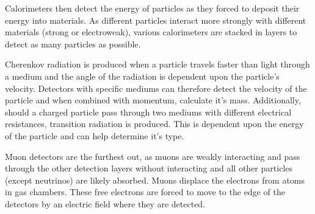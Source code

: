  Calorimeters then detect the energy of particles as they forced to deposit their energy into materials. As different particles interact more strongly with different materials (strong or electroweak), various calorimeters are stacked in layers to detect as many particles as possible.
 
Cherenkov radiation is produced when a particle travels faster than light through a medium and the angle of the radiation is dependent upon the particle's velocity. Detectors with specific mediums can therefore detect the velocity of the particle and when combined with momentum, calculate it's mass. \cite{CERN:Detectors} Additionally, should a charged particle pass through two mediums with different electrical resistances, transition radiation is produced. This is dependent upon the energy of the particle and can help determine it's type.
 
 Muon detectors are the furthest out, as muons are weakly interacting and pass through the other detection layers without interacting and all other particles (except neutrinos) are likely absorbed. Muons displace the electrons from atoms in gas chambers. These free electrons are forced to move to the edge of the detectors by an electric field where they are detected.
 
 \cite{Uni:NuclearNotes} 
